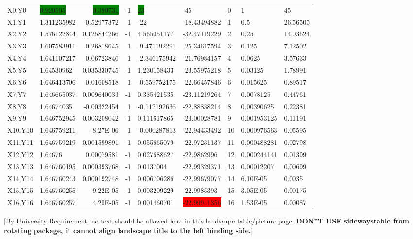 \begin{landscape}
\begin{table}[!hbtp]
\begin{tabular}{|l|l|r|r|l|l|l|l|l|}
    X0,Y0 & \colorbox{green}{0.920505} & \colorbox{green}{0.390731} & -1    & \colorbox{green}{23}    & -45   & 0     & 1     & 45 \\
    X1,Y1 & 1.311235982 & -0.52977372 & 1     & -22   & -18.43494882 & 1     & 0.5   & 26.56505 \\
    X2,Y2 & 1.576122844 & 0.125844266 & -1    & 4.565051177 & -32.47119229 & 2     & 0.25  & 14.03624 \\
    X3,Y3 & 1.607583911 & -0.26818645 & 1     & -9.471192291 & -25.34617594 & 3     & 0.125 & 7.12502 \\
    X4,Y4 & 1.641107217 & -0.06723846 & 1     & -2.346175942 & -21.76984157 & 4     & 0.0625 & 3.57633 \\
    X5,Y5 & 1.64530962 & 0.035330745 & -1    & 1.230158433 & -23.55975218 & 5     & 0.03125 & 1.78991 \\
    X6,Y6 & 1.646413706 & -0.01608518 & 1     & -0.559752175 & -22.66457846 & 6     & 0.015625 & 0.89517 \\
    X7,Y7 & 1.646665037 & 0.009640033 & -1    & 0.335421535 & -23.11219264 & 7     & 0.0078125 & 0.44761 \\
    X8,Y8 & 1.64674035 & -0.00322454 & 1     & -0.112192636 & -22.88838214 & 8     & 0.00390625 & 0.22381 \\
    X9,Y9 & 1.646752945 & 0.003208042 & -1    & 0.111617865 & -23.00028781 & 9     & 0.001953125 & 0.11191 \\
    X10,Y10 & 1.646759211 & -8.27E-06 & 1     & -0.000287813 & -22.94433492 & 10    & 0.000976563 & 0.05595 \\
    X11,Y11 & 1.646759219 & 0.001599891 & -1    & 0.055665079 & -22.97231137 & 11    & 0.000488281 & 0.02798 \\
    X12,Y12 & 1.64676 & 0.00079581 & -1    & 0.027688627 & -22.9862996 & 12    & 0.000244141 & 0.01399 \\
    X13,Y13 & 1.646760195 & 0.000393768 & -1    & 0.0137004 & -22.99329371 & 13    & 0.00012207 & 0.00699 \\
    X14,Y14 & 1.646760243 & 0.000192748 & -1    & 0.006706286 & -22.99679077 & 14    & 6.10E-05 & 0.0035 \\
    X15,Y15 & 1.646760255 & 9.22E-05 & -1    & 0.003209229 & -22.9985393 & 15    & 3.05E-05 & 0.00175 \\
    X16,Y16 & 1.646760257 & 4.20E-05 & -1    & 0.001460701 & \colorbox{red}{-22.99941356} & 16    & 1.53E-05 & 0.00087 \\
    \bottomrule
    \end{tabular}%
           
             {\small [By University Requirement, no text should be allowed here in this landscape table/picture page. \textbf{ DON''T USE sidewaystable from rotating package, it cannot align landscape title to the left binding side.}]}
\end{table}
\end{landscape}
